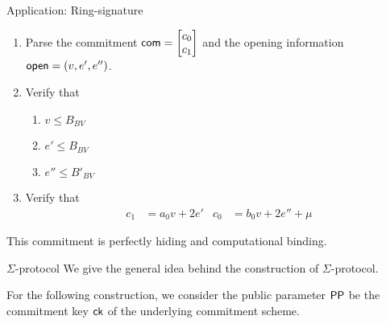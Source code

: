 \begin{section}{Application: Ring-signature}
\begin{description}
\begin{enumerate}
      \item Parse the commitment $\mathsf{com} = \begin{bmatrix} c_0 \\ c_1 \end{bmatrix}$
      and the opening information $\mathsf{open} = (v, e', e'')$.
      \item Verify that
      \begin{enumerate}
        \item $v \leq B_{BV}$
        \item $e' \leq B_{BV}$
        \item $e'' \leq B'_{BV}$
      \end{enumerate}
      \item Verify that
      \begin{align*}
        c_1 &= a_0 v + 2e' & c_0 &= b_0v +2 e'' + \mu
      \end{align*}
    \end{enumerate}
  \end{description}

  This commitment is perfectly hiding and computational binding.

  \begin{subsection}{$\Sigma$-protocol}
    We give the general idea behind the construction of $\Sigma$-protocol.


    For the following construction, we consider the public parameter ${\mathsf{PP}}$ be the commitment key $\mathsf{ck}$ of the underlying commitment scheme.
    \begin{description}



\end{description}
\end{subsection}
\end{section}
